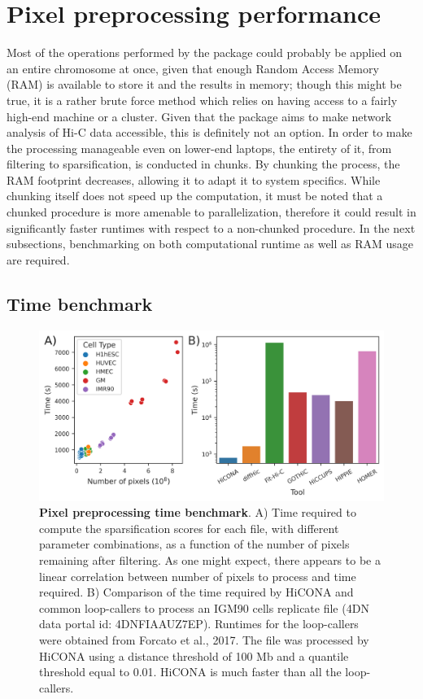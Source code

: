

\section{Pixel preprocessing performance}
Most of the operations performed by the package could probably be applied on an entire chromosome at once, given that enough Random Access Memory (RAM) is available to store it and the results in memory; though this might be true, it is a rather brute force method which relies on having access to a fairly high-end machine or a cluster. Given that the package aims to make network analysis of Hi-C data accessible, this is definitely not an option. In order to make the processing manageable even on lower-end laptops, the entirety of it, from filtering to sparsification, is conducted in chunks. By chunking the process, the RAM footprint decreases, allowing it to adapt it to system specifics. While chunking itself does not speed up the computation, it must be noted that a chunked procedure is more amenable to parallelization, therefore it could result in significantly faster runtimes with respect to a non-chunked procedure. 
In the next subsections, benchmarking on both computational runtime as well as RAM usage are required.

\subsection{Time benchmark}

\begin{figure}[ht]
  \centering
  \includegraphics[width=1\textwidth]{time_benchmark.png}
  \caption{\textbf{Pixel preprocessing time benchmark}. A) Time required to compute the sparsification scores for each file, with different parameter combinations, as a function of the number of pixels remaining after filtering. As one might expect, there appears to be a linear correlation between number of pixels to process and time required. B) Comparison of the time required by HiCONA and common loop-callers to process an IGM90 cells replicate file (4DN data portal id: 4DNFIAAUZ7EP). Runtimes for the loop-callers were obtained from Forcato et al., 2017. The file was processed by HiCONA using a distance threshold of 100 Mb and a quantile threshold equal to 0.01. HiCONA is much faster than all the loop-callers.}
  \label{fig:timebenchmark}
\end{figure}

